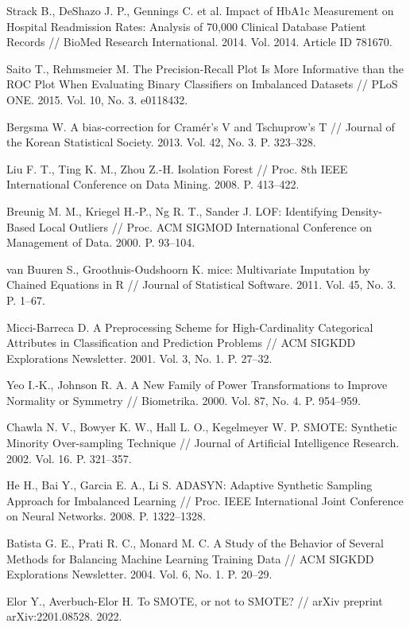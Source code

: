 \documentclass[14pt,a4paper]{extreport}
\begin{document}
\begin{enumerate}[label={[\arabic*]},ref={\arabic*},leftmargin=*,labelindent=0pt]
\item \label{ref:strack} Strack B., DeShazo J. P., Gennings C. et al. Impact of HbA1c Measurement on Hospital Readmission Rates: Analysis of 70,000 Clinical Database Patient Records // BioMed Research International. 2014. Vol. 2014. Article ID 781670.
\item \label{ref:saito} Saito T., Rehmsmeier M. The Precision-Recall Plot Is More Informative than the ROC Plot When Evaluating Binary Classifiers on Imbalanced Datasets // PLoS ONE. 2015. Vol. 10, No. 3. e0118432.
\item \label{ref:bergsma} Bergsma W. A bias-correction for Cramér's V and Tschuprow's T // Journal of the Korean Statistical Society. 2013. Vol. 42, No. 3. P. 323--328.
\item \label{ref:iforest} Liu F. T., Ting K. M., Zhou Z.-H. Isolation Forest // Proc. 8th IEEE International Conference on Data Mining. 2008. P. 413--422.
\item \label{ref:lof} Breunig M. M., Kriegel H.-P., Ng R. T., Sander J. LOF: Identifying Density-Based Local Outliers // Proc. ACM SIGMOD International Conference on Management of Data. 2000. P. 93--104.
\item \label{ref:mice} van Buuren S., Groothuis-Oudshoorn K. mice: Multivariate Imputation by Chained Equations in R // Journal of Statistical Software. 2011. Vol. 45, No. 3. P. 1--67.
\item \label{ref:target} Micci-Barreca D. A Preprocessing Scheme for High-Cardinality Categorical Attributes in Classification and Prediction Problems // ACM SIGKDD Explorations Newsletter. 2001. Vol. 3, No. 1. P. 27--32.
\item \label{ref:yeojohnson} Yeo I.-K., Johnson R. A. A New Family of Power Transformations to Improve Normality or Symmetry // Biometrika. 2000. Vol. 87, No. 4. P. 954--959.
\item \label{ref:smote} Chawla N. V., Bowyer K. W., Hall L. O., Kegelmeyer W. P. SMOTE: Synthetic Minority Over-sampling Technique // Journal of Artificial Intelligence Research. 2002. Vol. 16. P. 321--357.
\item \label{ref:adasyn} He H., Bai Y., Garcia E. A., Li S. ADASYN: Adaptive Synthetic Sampling Approach for Imbalanced Learning // Proc. IEEE International Joint Conference on Neural Networks. 2008. P. 1322--1328.
\item \label{ref:batista} Batista G. E., Prati R. C., Monard M. C. A Study of the Behavior of Several Methods for Balancing Machine Learning Training Data // ACM SIGKDD Explorations Newsletter. 2004. Vol. 6, No. 1. P. 20--29.
\item \label{ref:elor} Elor Y., Averbuch-Elor H. To SMOTE, or not to SMOTE? // arXiv preprint arXiv:2201.08528. 2022.
\end{enumerate}
\end{document}
